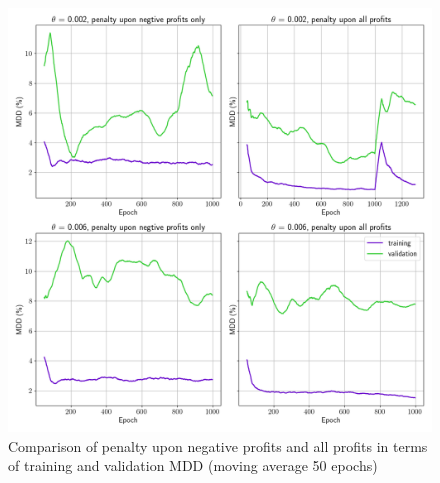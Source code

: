 \begin{figure}[ht]
  \includegraphics[width=15cm]{images/penalty_negtive_profits_compare.png}
  \caption [Comparison of penalty all profits and negative profits only] {Comparison of penalty upon negative profits and all profits in terms of training and validation MDD (moving average 50 epochs)}
  \label{fig:negtive_profits_diagram}
\end{figure}


